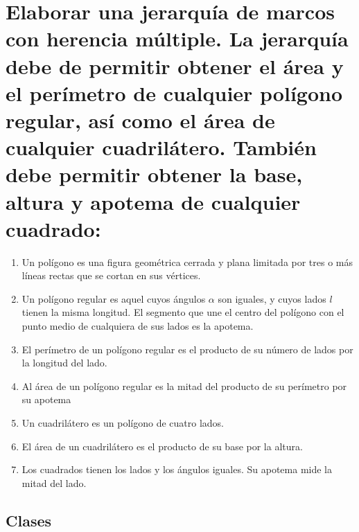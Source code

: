 \documentclass[10pt, a4paper,spanish]{article}
\begin{document}
	\section{Elaborar una jerarquía de marcos con herencia múltiple. La jerarquía debe de permitir obtener el área y el perímetro de cualquier polígono regular, así como el área de cualquier cuadrilátero. También debe permitir obtener la base, altura y apotema de cualquier cuadrado:}

		\begin{enumerate}[label=\alph*)]

			\item Un polígono es una figura geométrica cerrada y plana limitada por tres o más líneas rectas que se cortan en sus vértices.

			\item Un polígono regular es aquel cuyos ángulos $\alpha$ son iguales, y cuyos lados $l$ tienen la misma longitud. El segmento que une el centro del polígono con el punto medio de cualquiera de sus lados es la apotema.

			\item El perímetro de un polígono regular es el producto de su número de lados por la longitud del lado.

			\item Al área de un polígono regular es la mitad del producto de su perímetro por su apotema

			\item Un cuadrilátero es un polígono de cuatro lados.

			\item El área de un cuadrilátero es el producto de su base por la altura.

			\item Los cuadrados tienen los lados y los ángulos iguales. Su apotema mide la mitad del lado.

		\end{enumerate}

    \subsection{Clases}

			\begin{figure}[H]
				\centering
        
			\end{figure}

			\begin{figure}[H]
				\centering
        
			\end{figure}
\end{document}
